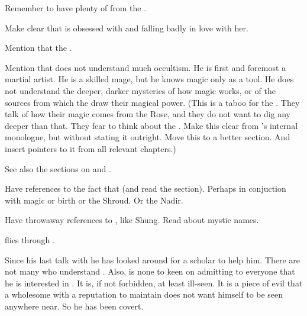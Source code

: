 

Remember to have plenty of  from the \resphain. 

Make clear that \Teshrial is obsessed with \Firaxel and falling badly in love with her. 
    
Mention that the \resphain {}. 

Mention that \Teshrial does not understand much occultism.
He is first and foremost a martial artist.
He is a skilled mage, but he knows magic only as a tool. 
He does not understand the deeper, darker mysteries of how magic works, or of the sources from which the \resphain draw their magical power. 
(This is a taboo for the \resphain. 
 They talk of how their magic comes from the Rose, and they do not want to dig any deeper than that.
 They fear to think about the \SitraAchras. 
 Make this clear from \Teshrial's internal monologue, but without stating it outright.
 Move this to a better section. 
 And insert pointers to it from all relevant chapters.)

See also the sections on  and . 
    
Have references to the fact that  (and read the section). 
Perhaps in conjuction with magic or birth or the Shroud.  
Or the Nadir. 

Have throwaway references to , like Shung. 
Read about mystic names. 



\begin{comment}
  \section{Teshrial flies}
\end{comment}

\Teshrial flies through \Nyx. 

Since his last talk with \Menessiaraid he has looked around for a scholar to help him. 
There are not many who understand \WanderersInDarknessEmph. 
Also, \Teshrial is none to keen on admitting to everyone that he is interested in \WanderersInDarknessEmph. 
It is, if not forbidden, at least ill-seen. 
It is a piece of evil that a wholesome \resphan with a reputation to maintain does not want himself to be seen anywhere near. 
So he has been covert. 

